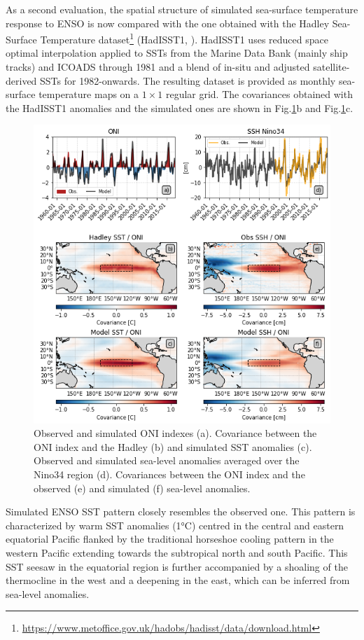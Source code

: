 As a second evaluation, the spatial structure of simulated sea-surface temperature response to ENSO is now compared with the one obtained with the Hadley Sea-Surface Temperature dataset\footnote{\url{https://www.metoffice.gov.uk/hadobs/hadisst/data/download.html}} (HadISST1, \citealt{raynerGlobalAnalysesSea2003}). HadISST1 uses reduced space optimal interpolation applied to SSTs from the Marine Data Bank (mainly ship tracks) and ICOADS through 1981 and a blend of in-situ and adjusted satellite-derived SSTs for 1982-onwards. The resulting dataset is provided as monthly sea-surface temperature maps on a $1\times 1$ regular grid. The covariances obtained with the HadISST1 anomalies and the simulated ones are shown in Fig.\ref{fig:nemo-had-sst}b and Fig.\ref{fig:nemo-had-sst}c.

\begin{figure}
	\centering
	\includegraphics[scale=0.6]{figs/fig1.png}
	\caption{Observed and simulated ONI indexes (a). Covariance between the ONI index and the Hadley (b) and simulated SST anomalies (c). Observed and simulated sea-level anomalies averaged over the Nino34 region (d). Covariances between the ONI index and the observed (e) and simulated (f) sea-level anomalies.}
	\label{fig:nemo-had-sst}
\end{figure}

Simulated ENSO SST  pattern closely resembles the observed one. This pattern is characterized by warm SST anomalies (1°C) centred in the central and eastern equatorial Pacific  flanked by the traditional horseshoe cooling pattern in the western Pacific extending towards the subtropical north and south Pacific. This SST seesaw in the equatorial region is further accompanied by a shoaling of the thermocline in the west and a deepening in the east, which can be inferred from sea-level anomalies.

